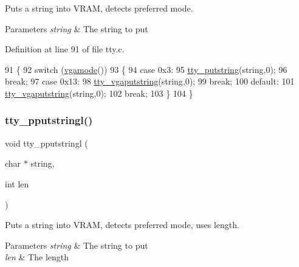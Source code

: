 Puts a string into V\+R\+AM, detects preferred mode. 


\begin{DoxyParams}{Parameters}
{\em string} & The string to put \\
\hline
\end{DoxyParams}


Definition at line 91 of file tty.\+c.


\begin{DoxyCode}
91                                   \{
92     \textcolor{keywordflow}{switch} (\hyperlink{a00041_af6d170c9401ea8f94d4c5cf09347cca7_af6d170c9401ea8f94d4c5cf09347cca7}{vgamode}())
93     \{
94     \textcolor{keywordflow}{case} 0x3:
95         \hyperlink{a00140_a5b5bf610a57f3c59b2851fa2652081ec_a5b5bf610a57f3c59b2851fa2652081ec}{tty\_putstring}(\textcolor{keywordtype}{string},0);
96         \textcolor{keywordflow}{break};
97     \textcolor{keywordflow}{case} 0x13:
98         \hyperlink{a00140_a05ca3f5e64f38fec173b635ca8465415_a05ca3f5e64f38fec173b635ca8465415}{tty\_vgaputstring}(\textcolor{keywordtype}{string},0);
99         \textcolor{keywordflow}{break};
100     \textcolor{keywordflow}{default}:
101         \hyperlink{a00140_a05ca3f5e64f38fec173b635ca8465415_a05ca3f5e64f38fec173b635ca8465415}{tty\_vgaputstring}(\textcolor{keywordtype}{string},0);
102         \textcolor{keywordflow}{break};
103     \}
104 \}
\end{DoxyCode}
\mbox{\label{a00140_abaf93f9e56ddb7b10462070f59e534e4_abaf93f9e56ddb7b10462070f59e534e4}} 
\subsubsection{\texorpdfstring{tty\+\_\+pputstringl()}{tty\_pputstringl()}}
{\footnotesize\ttfamily void tty\+\_\+pputstringl (\begin{DoxyParamCaption}\item[{char $\ast$}]{string,  }\item[{int}]{len }\end{DoxyParamCaption})}



Puts a string into V\+R\+AM, detects preferred mode, uses length. 


\begin{DoxyParams}{Parameters}
{\em string} & The string to put \\
\hline
{\em len} & The length \\
\hline
\end{DoxyParams}



